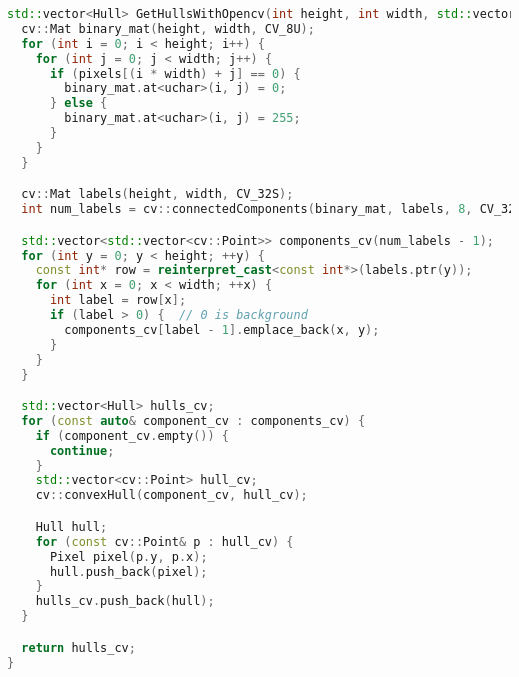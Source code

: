 \documentclass[12pt]{article}
\begin{document}
\label{appendix:get_hulls_with_opencv}
\begin{lstlisting}[language=C++, caption={Функция GetHullsWithOpencv() построения оболочек компонент с помощью OpenCV}]
std::vector<Hull> GetHullsWithOpencv(int height, int width, std::vector<int>& pixels) {
  cv::Mat binary_mat(height, width, CV_8U);
  for (int i = 0; i < height; i++) {
    for (int j = 0; j < width; j++) {
      if (pixels[(i * width) + j] == 0) {
        binary_mat.at<uchar>(i, j) = 0;
      } else {
        binary_mat.at<uchar>(i, j) = 255;
      }
    }
  }

  cv::Mat labels(height, width, CV_32S);
  int num_labels = cv::connectedComponents(binary_mat, labels, 8, CV_32S);

  std::vector<std::vector<cv::Point>> components_cv(num_labels - 1);
  for (int y = 0; y < height; ++y) {
    const int* row = reinterpret_cast<const int*>(labels.ptr(y));
    for (int x = 0; x < width; ++x) {
      int label = row[x];
      if (label > 0) {  // 0 is background
        components_cv[label - 1].emplace_back(x, y);
      }
    }
  }

  std::vector<Hull> hulls_cv;
  for (const auto& component_cv : components_cv) {
    if (component_cv.empty()) {
      continue;
    }
    std::vector<cv::Point> hull_cv;
    cv::convexHull(component_cv, hull_cv);

    Hull hull;
    for (const cv::Point& p : hull_cv) {
      Pixel pixel(p.y, p.x);
      hull.push_back(pixel);
    }
    hulls_cv.push_back(hull);
  }

  return hulls_cv;
}
\end{lstlisting}
\end{document}
